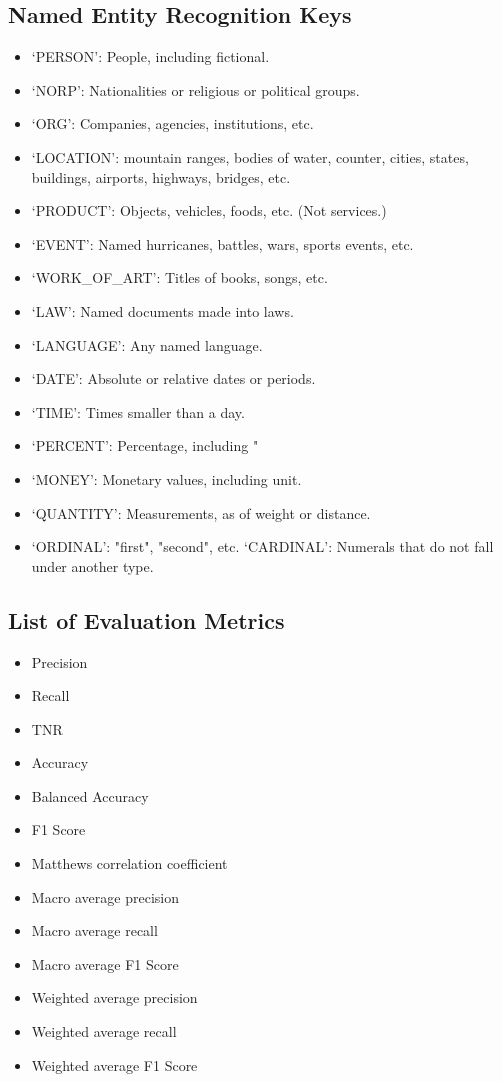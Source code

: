 \documentclass[11pt]{article}
\begin{document}
\subsection* {Named Entity Recognition Keys}
\begin{itemize}
\setlength\itemsep{-0.25em}
\item `PERSON':	People, including fictional.
\item `NORP':	Nationalities or religious or political groups.
\item `ORG':	Companies, agencies, institutions, etc.
\item `LOCATION':	mountain ranges, bodies of water, counter, cities, states, 
buildings, airports, highways, bridges, etc.
\item `PRODUCT':	Objects, vehicles, foods, etc. (Not services.)
\item `EVENT':	Named hurricanes, battles, wars, sports events, etc.
\item `WORK\_OF\_ART':	Titles of books, songs, etc.
\item `LAW':	Named documents made into laws.
\item `LANGUAGE':	Any named language.
\item `DATE':	Absolute or relative dates or periods.
\item `TIME':	Times smaller than a day.
\item `PERCENT':	Percentage, including "%
\item `MONEY':	Monetary values, including unit.
\item `QUANTITY':	Measurements, as of weight or distance.
\item `ORDINAL':	"first", "second", etc.
`CARDINAL':	Numerals that do not fall under another type.
\end{itemize}

\subsection* {List of Evaluation Metrics}

\begin{itemize}
\setlength\itemsep{-0.25em}

\item Precision 
\item Recall 
\item TNR
\item Accuracy
\item Balanced Accuracy
\item F1 Score
\item Matthews correlation coefficient
\item Macro average precision
\item Macro average recall
\item Macro average F1 Score
\item Weighted average precision
\item Weighted average recall
\item Weighted average F1 Score

\end{itemize}
\end{document}
